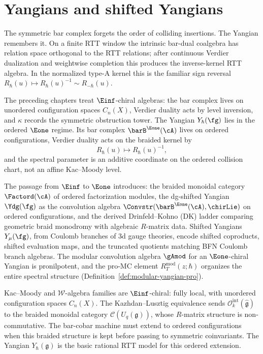 \chapter{Yangians and shifted Yangians}
\label{chap:yangians}
\label{rem:yangian-status}

\providecommand{\PhiFA}{\Phi^{\mathrm{FA}}}
\providecommand{\SpCh}{\mathrm{Sp}^{\mathrm{ch}}}


The symmetric bar complex forgets the order of colliding insertions.
The Yangian remembers it.  On a finite RTT window the intrinsic
bar-dual coalgebra has relation space orthogonal to the RTT relations;
after continuous Verdier dualization and weightwise completion this
produces the inverse-kernel RTT algebra.  In the normalized type-A
kernel this is the familiar sign reversal
$R_\hbar(u)\mapsto R_\hbar(u)^{-1}\sim R_{-\hbar}(u)$.

The preceding chapters treat $\Einf$-chiral algebras: the bar complex
lives on unordered configuration spaces $C_n(X)$, Verdier duality acts
by level inversion, and $\kappa$ records the symmetric obstruction
tower.  The Yangian $Y_\hbar(\fg)$ lies in the ordered
$\Eone$ regime.  Its bar complex
$\barB^{\Eone}(\cA)$ lives on ordered configurations, Verdier duality
acts on the braided kernel by
\[
        R_\hbar(u)\longmapsto R_\hbar(u)^{-1},
\]
and the spectral parameter is an additive coordinate on the ordered
collision chart, not an affine Kac--Moody level.

The passage from $\Einf$ to $\Eone$ introduces: the braided monoidal
category $\Factord(\cA)$ of ordered factorization modules, the
dg-shifted Yangian $\Ydg(\fg)$ as the convolution algebra
$\Convstr(\barB^{\Eone}(\cA), \chirLie)$ on ordered configurations,
and the derived Drinfeld--Kohno (DK) ladder comparing geometric braid
monodromy with algebraic $R$-matrix data. Shifted Yangians
$Y_\mu(\fg)$, from Coulomb branches of 3d gauge theories, encode
shifted coproducts, shifted evaluation maps, and the truncated
quotients matching BFN Coulomb branch algebras. The modular
convolution algebra $\gAmod$ for an $\Eone$-chiral Yangian is
pronilpotent, and the pro-MC element
$R_T^{\mathrm{mod}}(z;\hbar)$ organizes the entire spectral structure
(Definition~\ref{def:modular-yangian-pro}).

Kac--Moody and $\mathcal{W}$-algebra families are
$\Einf$-chiral: fully local, with unordered configuration spaces
$C_n(X)$. The Kazhdan--Lusztig equivalence
\cite{KL93}
sends $\mathcal{O}_k^{\mathrm{int}}(\widehat{\mathfrak{g}})$ to the
braided monoidal category $\mathcal{C}(U_q(\mathfrak{g}))$, whose
$R$-matrix structure is non-commutative. The bar-cobar machine must
extend to ordered configurations when this braided structure is kept
before passing to symmetric coinvariants. The Yangian
$Y_\hbar(\mathfrak{g})$ is the basic rational RTT model for this
ordered extension.

